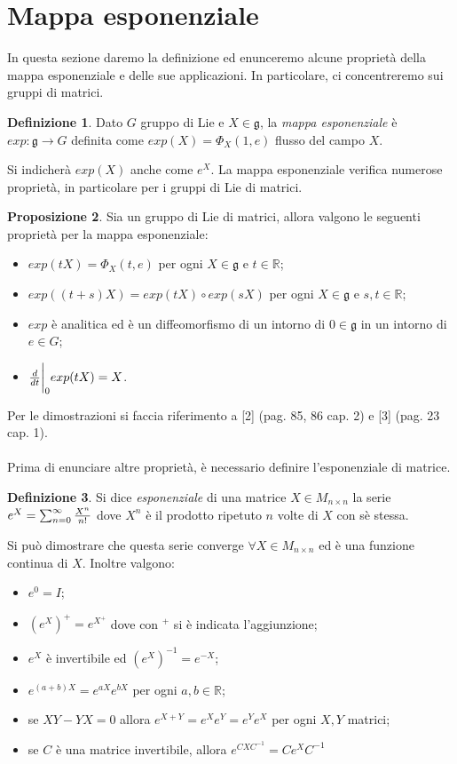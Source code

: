 \documentclass[12pt,a4paper]{report}
\theoremstyle{definition}
\newtheorem{Def}{Definizione}[chapter]
\newtheorem{Prop}[Def]{Proposizione}
\theoremstyle{definition}
\theoremstyle{definition}
\theoremstyle{remark}
\begin{document}
\section{Mappa esponenziale}
In questa sezione daremo la definizione ed enunceremo alcune proprietà della mappa esponenziale e delle sue applicazioni. In particolare, ci concentreremo sui gruppi di matrici.\\
\begin{Def}
	Dato $G$ gruppo di Lie e $X\in\mathfrak{g}$, la \textit{mappa esponenziale} è \\$exp:\mathfrak{g}\rightarrow G$ definita come $exp(X)=\Phi_X(1,e)$ flusso del campo $X$.
\end{Def}
Si indicherà $exp(X)$ anche come $e^X$.
La mappa esponenziale verifica numerose proprietà, in particolare per i gruppi di Lie di matrici.
\begin{Prop}
	Sia un gruppo di Lie di matrici, allora valgono le seguenti proprietà per la mappa esponenziale:\begin{itemize}
		\item $exp(tX)=\Phi_X(t,e)$ per ogni $X\in \mathfrak{g}$ e $t\in \mathbb{R}$;
		\item $exp((t+s)X)=exp(tX)\circ exp(sX)$ per ogni $X\in \mathfrak{g}$ e $s,t\in\mathbb{R}$;
		\item $exp$ è analitica ed è un diffeomorfismo di un intorno di $0\in\mathfrak{g}$ in un intorno di $e\in G$;
		\item ${d\over dt}\bigg{\rvert}_0exp(tX)=X$. 
	\end{itemize}
\end{Prop}
Per le dimostrazioni si faccia riferimento a [2] (pag. 85, 86 cap. 2) e [3] (pag. 23 cap. 1).\\
\\
Prima di enunciare altre proprietà, è necessario definire l'esponenziale di matrice.
\begin{Def}
	Si dice \textit{esponenziale} di una matrice $X\in M_{n\times n}$ la serie \\$e^X=\sum_{n=0}^{\infty}{X^n\over n! }$ dove $X^n$ è il prodotto ripetuto $n$ volte di $X$ con sè stessa.
\end{Def}
Si può dimostrare che questa serie converge $\forall X\in M_{n\times n}$ ed è una funzione continua di $X$. Inoltre valgono:\begin{itemize}
	\item $e^0=I$;
	\item $(e^X)^+=e^{X^+}$ dove con $^+$ si è indicata l'aggiunzione;
	\item $e^X$ è invertibile ed $(e^X)^{-1}=e^{-X}$;
	\item $e^{(a+b)X}=e^{aX}e^{bX}$ per ogni $a,b\in\mathbb{R}$;
	\item se $XY-YX=0$ allora $e^{X+Y}=e^Xe^Y=e^Ye^X$ per ogni $X,Y$ matrici;\\
	\item se $C$ è una matrice invertibile, allora $e^{CXC^{-1}}=Ce^XC^{-1}$
\end{itemize} 
\end{document}
